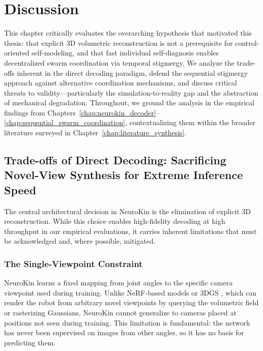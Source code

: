 \documentclass[12pt,a4paper,oneside]{report}
\begin{document}
\clearpage

\chapter{Discussion}
\label{chap:discussion_main}

This chapter critically evaluates the overarching hypothesis that motivated this thesis: that explicit 3D volumetric reconstruction is not a prerequisite for control-oriented self-modeling, and that fast individual self-diagnosis enables decentralized swarm coordination via temporal stigmergy. We analyze the trade-offs inherent in the direct decoding paradigm, defend the sequential stigmergy approach against alternative coordination mechanisms, and discuss critical threats to validity—particularly the simulation-to-reality gap and the abstraction of mechanical degradation. Throughout, we ground the analysis in the empirical findings from Chapters~\ref{chap:neurokin_decoder}--\ref{chap:sequential_swarm_coordination}, contextualizing them within the broader literature surveyed in Chapter~\ref{chap:literature_synthesis}.

\section{Trade-offs of Direct Decoding: Sacrificing Novel-View Synthesis for Extreme Inference Speed}

The central architectural decision in NeuroKin is the elimination of explicit 3D reconstruction. While this choice enables high-fidelity decoding at high throughput in our empirical evaluations, it carries inherent limitations that must be acknowledged and, where possible, mitigated.

\subsection{The Single-Viewpoint Constraint}
\label{subsec:the_single_viewpoint_constraint_main}

NeuroKin learns a fixed mapping from joint angles to the specific camera viewpoint used during training. Unlike NeRF-based models \cite{mildenhall2020nerf} or 3DGS \cite{kerbl20233d}, which can render the robot from arbitrary novel viewpoints by querying the volumetric field or rasterizing Gaussians, NeuroKin cannot generalize to cameras placed at positions not seen during training. This limitation is fundamental: the network has never been supervised on images from other angles, so it has no basis for predicting them.
\end{document}
